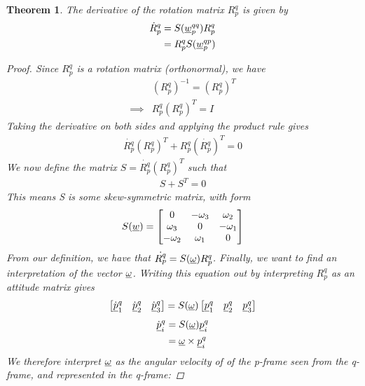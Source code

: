 \documentclass{article}
\newtheorem{theorem}{Theorem}
\begin{document}
\begin{theorem}
    The derivative of the rotation matrix $R_p^q$ is given by
    \begin{align*}
        \dot{R}_p^q &= S(\underline{w}_p^{qq})R_p^q \\
        &= R_p^qS(\underline{w}_p^{qp})
    \end{align*}
    \begin{proof}
        Since $R_p^q$ is a rotation matrix (orthonormal), we have
        \begin{align*}
            &(R_p^q)^{-1} = (R_p^q)^T \\
            \implies &R_p^q(R_p^q)^T = I
        \end{align*}
        Taking the derivative on both sides and applying the product rule gives
        \begin{align*}
            \dot{R_p^q}(R_p^q)^T + R_p^q(\dot{R_p^q})^T = 0
        \end{align*}
        We now define the matrix $S = \dot{R_p^q}(R_p^q)^T$ such that
        \begin{align*}
            S + S^T = 0
        \end{align*}
        This means S is some skew-symmetric matrix, with form
        \begin{align*}
            S(\underline{w}) = \begin{bmatrix}
                0 & -\omega_3 &\omega_2 \\ 
                \omega_3 &  0 & -\omega_1 \\
                -\omega_2 & \omega_1 & 0
            \end{bmatrix}
        \end{align*}
        From our definition, we have that $\dot{R_p^q} = S(\underline{\omega})R_p^q$. Finally, we want to find an interpretation of the vector $\underline{\omega}$. Writing this equation out by interpreting $R_p^q$ as an attitude matrix gives
        $$\begin{bmatrix} \dot{\underline{p}}_1^q & \dot{\underline{p}}_2^q & \dot{\underline{p}}_3^q\end{bmatrix} = S(\underline{\omega})\begin{bmatrix} {\underline{p}}_1^q & {\underline{p}}_2^q & {\underline{p}}_3^q\end{bmatrix}$$
        \begin{align*}
            \dot{\underline{p}}_i^q &= S(\underline{\omega})\underline{p}_i^q\\
            &= \underline{\omega} \times \underline{p}_i^q
        \end{align*}
        We therefore interpret $\underline{\omega}$ as the angular velocity of of the p-frame seen from the q-frame, and represented in the q-frame:

\end{proof}
\end{theorem}
\end{document}
